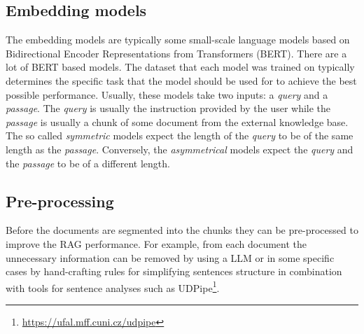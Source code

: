 \subsection{Embedding models}

The embedding models are typically some small-scale language models based on Bidirectional Encoder Representations from Transformers (BERT). There are a lot of BERT based models. The dataset that each model was trained on typically determines the specific task that the model should be used for to achieve the best possible performance. Usually, these models take two inputs: a \textit{query} and a \textit{passage}. The \textit{query} is usually the instruction provided by the user while the \textit{passage} is usually a chunk of some document from the external knowledge base. The so called \textit{symmetric} models expect the length of the \textit{query} to be of the same length as the \textit{passage}. Conversely, the \textit{asymmetrical} models expect the \textit{query} and the \textit{passage} to be of a different length.


\subsection{Pre-processing}

Before the documents are segmented into the chunks they can be pre-processed to improve the RAG performance. For example, from each document the unnecessary information can be removed by using a LLM or in some specific cases by hand-crafting rules for simplifying sentences structure in combination with tools for sentence analyses such as UDPipe\footnote{\url{https://ufal.mff.cuni.cz/udpipe}}.
